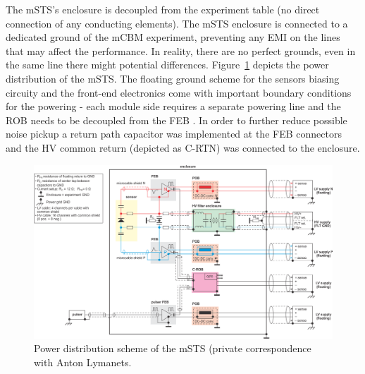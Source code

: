 The \gls{mSTS}'s enclosure is decoupled from the experiment table (no direct connection of any conducting elements). The \gls{mSTS} enclosure is connected to a dedicated ground of the \gls{mCBM} experiment, preventing any \gls{EMI} on the lines that may affect the performance. In reality, there are no perfect grounds, even in the same line there might potential differences.  Figure~\ref{fig_msts_power} depicts the power distribution of the \gls{mSTS}. The floating ground scheme for the sensors biasing circuity and the front-end electronics come with important boundary conditions for the powering - each module side requires a separate powering line and the \gls{ROB} needs to be decoupled from the \gls{FEB} \cite{RodriguezRodriguez2020}. In order to further reduce possible noise pickup a return path capacitor was implemented at the \gls{FEB} connectors and the \gls{HV} common return (depicted as C-RTN) was connected to the enclosure.
\begin{figure}[!h]
\centering
\includegraphics[width=1\columnwidth]{Chapter6/DCS/images/power_distribution.png}
\caption{Power distribution scheme of the \gls{mSTS} (private correspondence with Anton Lymanets.}
\label{fig_msts_power}
\end{figure}
\newpage
